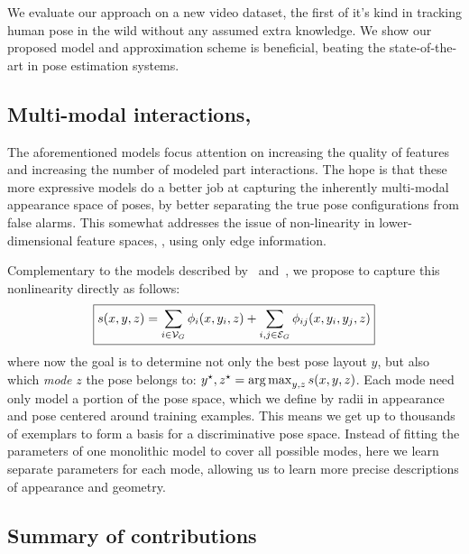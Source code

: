 We evaluate our approach on a new video dataset, the first of it's kind in 
tracking human pose in the wild without any assumed extra knowledge. We show 
our proposed model and approximation scheme is beneficial, beating the 
state-of-the-art in pose estimation systems.

\subsection{Multi-modal interactions,~}
\label{sec:contrib3}
The aforementioned models focus attention on increasing the quality of features 
and increasing the number of modeled part interactions.  The hope is that these 
more expressive models do a better job at capturing the inherently multi-modal 
appearance space of poses, by better separating the true pose configurations 
from false alarms.  This somewhat addresses the issue of non-linearity in 
lower-dimensional feature spaces, \eg, using only edge information.

Complementary to the models described by~ 
and~, we propose to capture this nonlinearity directly as 
follows:
\begin{equation}
\boxed{s(x,y,z) =  \sum_{i \in \mathcal{V}_{G}} \phi_i(x,y_i,z) + \sum_{i,j \in 
\mathcal{E}_{G}} \phi_{ij}(x,y_i,y_j,z)}
\label{eq:contrib3}
\end{equation}
where now the goal is to determine not only the best pose layout $y$, but also 
which {\em mode} $z$ the pose belongs to: $y^\star,z^\star = \mathop{\arg\max}_{y,z} 
s(x,y,z)$.  Each mode need only model a portion of the pose space, which we 
define by radii in appearance and pose centered around training examples.  This 
means we get up to thousands of exemplars to form a basis for a discriminative 
pose space.  Instead of fitting the parameters of one monolithic model to cover 
all possible modes, here we learn separate parameters for each mode, allowing 
us to learn more precise descriptions of appearance and geometry.

\subsection{Summary of contributions}

